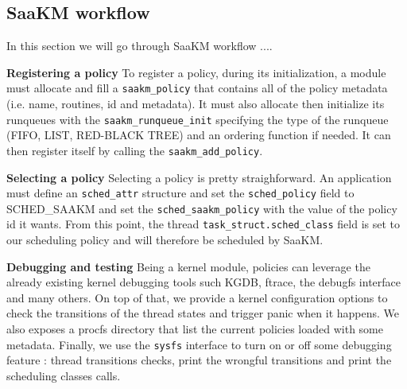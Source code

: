 \subsection{SaaKM workflow}

\par In this section we will go through SaaKM workflow ....\newline

\par \textbf{Registering a policy} To register a policy, during its initialization, a module must allocate and fill a \texttt{saakm\_policy} that contains all of the policy metadata (i.e. name, routines, id and metadata). It must also allocate then initialize its runqueues with the \texttt{saakm\_runqueue\_init} specifying the type of the runqueue (FIFO, LIST, RED-BLACK TREE) and an ordering function if needed. It can then register itself by calling the \texttt{saakm\_add\_policy}.

\par \textbf{Selecting a policy} Selecting a policy is pretty straighforward. An application must define an \texttt{sched\_attr} structure and set the \texttt{sched\_policy} field to SCHED\_SAAKM and set the \texttt{sched\_saakm\_policy} with the value of the policy id it wants. From this point, the thread \texttt{task\_struct.sched\_class} field is set to our scheduling policy and will therefore be scheduled by SaaKM. \newline

\par \textbf{Debugging and testing} Being a kernel module, policies can leverage the already existing kernel debugging tools such KGDB, ftrace, the debugfs interface and many others. On top of that, we provide a kernel configuration options to check the transitions of the thread states and trigger panic when it happens. We also exposes a procfs directory that list the current policies loaded with some metadata. Finally, we use the \texttt{sysfs} interface to turn on or off some debugging feature : thread transitions checks, print the wrongful transitions and print the scheduling classes calls.
\newpage


